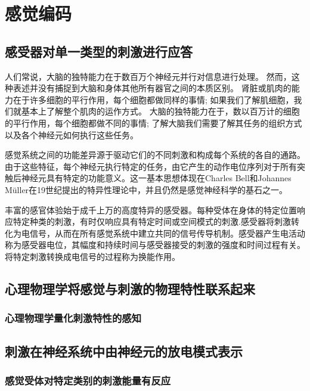 \chapter{感觉编码}


\section{感受器对单一类型的刺激进行应答}
人们常说，大脑的独特能力在于数百万个神经元并行对信息进行处理。
然而，这种表述并没有捕捉到大脑和身体其他所有器官之间的本质区别。
肾脏或肌肉的能力在于许多细胞的平行作用，每个细胞都做同样的事情; 
如果我们了解肌细胞，我们就基本上了解整个肌肉的运作方式。
大脑的独特能力在于，数以百万计的细胞的平行作用，每个细胞都做不同的事情; 
了解大脑我们需要了解其任务的组织方式以及各个神经元如何执行这些任务。

感觉系统之间的功能差异源于驱动它们的不同刺激和构成每个系统的各自的通路。由于这些特征，每个神经元执行特定的任务，由它产生的动作电位序列对于所有突触后神经元具有特定的功能意义。这一基本思想体现在Charles Bell和Johannes Müller在19世纪提出的特异性理论中，并且仍然是感觉神经科学的基石之一。

丰富的感官体验始于成千上万的高度特异的感受器。每种受体在身体的特定位置响应特定种类的刺激，有时仅响应具有特定时间或空间模式的刺激.感受器将刺激转化为电信号，从而在所有感觉系统中建立共同的信号传导机制。感受器产生电活动称为感受器电位，其幅度和持续时间与感受器接受的刺激的强度和时间过程有关。将特定刺激转换成电信号的过程称为换能作用。



\section{心理物理学将感觉与刺激的物理特性联系起来}


\subsection{心理物理学量化刺激特性的感知}



\section{刺激在神经系统中由神经元的放电模式表示}

\subsection{感觉受体对特定类别的刺激能量有反应}

